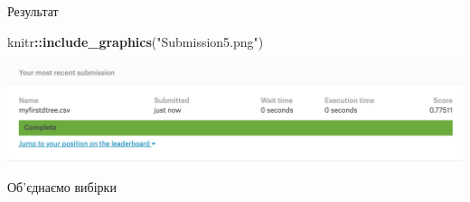 \documentclass[ignorenonframetext,]{beamer}
\newenvironment{Shaded}{\begin{snugshade}}{\end{snugshade}}
\newcommand{\KeywordTok}[1]{\textcolor[rgb]{0.13,0.29,0.53}{\textbf{#1}}}
\newcommand{\NormalTok}[1]{#1}
\newcommand{\OperatorTok}[1]{\textcolor[rgb]{0.81,0.36,0.00}{\textbf{#1}}}
\newcommand{\OtherTok}[1]{\textcolor[rgb]{0.56,0.35,0.01}{#1}}
\newcommand{\StringTok}[1]{\textcolor[rgb]{0.31,0.60,0.02}{#1}}
\begin{document}
\begin{frame}[fragile]{Результат}
\protect\hypertarget{ux440ux435ux437ux443ux43bux44cux442ux430ux442-2}{}

\begin{Shaded}
\begin{Highlighting}[]
\NormalTok{knitr}\OperatorTok{::}\KeywordTok{include_graphics}\NormalTok{(}\StringTok{"Submission5.png"}\NormalTok{)}
\end{Highlighting}
\end{Shaded}

\includegraphics[width=26.25in]{Submission5}

\end{frame}

\begin{frame}[fragile]{Об'єднаємо вибірки}
\protect\hypertarget{ux43eux431ux454ux434ux43dux430ux454ux43cux43e-ux432ux438ux431ux456ux440ux43aux438}{}

\begin{Shaded}
\end{Shaded}

\end{frame}
\end{document}
